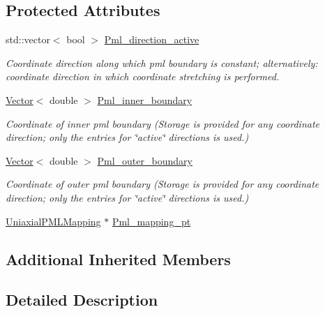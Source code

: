 \subsection*{Protected Attributes}
\begin{DoxyCompactItemize}
\item 
std\+::vector$<$ bool $>$ \hyperlink{classoomph_1_1AxisAlignedPMLElement_a6cc25fecc2e0f0b8a4920aae2e64964a}{Pml\+\_\+direction\+\_\+active}
\begin{DoxyCompactList}\small\item\em Coordinate direction along which pml boundary is constant; alternatively\+: coordinate direction in which coordinate stretching is performed. \end{DoxyCompactList}\item 
\hyperlink{classoomph_1_1Vector}{Vector}$<$ double $>$ \hyperlink{classoomph_1_1AxisAlignedPMLElement_adecf1b401aeab5399ce576c19667e455}{Pml\+\_\+inner\+\_\+boundary}
\begin{DoxyCompactList}\small\item\em Coordinate of inner pml boundary (Storage is provided for any coordinate direction; only the entries for \char`\"{}active\char`\"{} directions is used.) \end{DoxyCompactList}\item 
\hyperlink{classoomph_1_1Vector}{Vector}$<$ double $>$ \hyperlink{classoomph_1_1AxisAlignedPMLElement_aff04e9e225d24b9ce877204b7ae22921}{Pml\+\_\+outer\+\_\+boundary}
\begin{DoxyCompactList}\small\item\em Coordinate of outer pml boundary (Storage is provided for any coordinate direction; only the entries for \char`\"{}active\char`\"{} directions is used.) \end{DoxyCompactList}\item 
\hyperlink{classoomph_1_1UniaxialPMLMapping}{Uniaxial\+P\+M\+L\+Mapping} $\ast$ \hyperlink{classoomph_1_1AxisAlignedPMLElement_abb5b63cb5d08885239627640a74dd9d9}{Pml\+\_\+mapping\+\_\+pt}
\end{DoxyCompactItemize}
\subsection*{Additional Inherited Members}


\subsection{Detailed Description}
